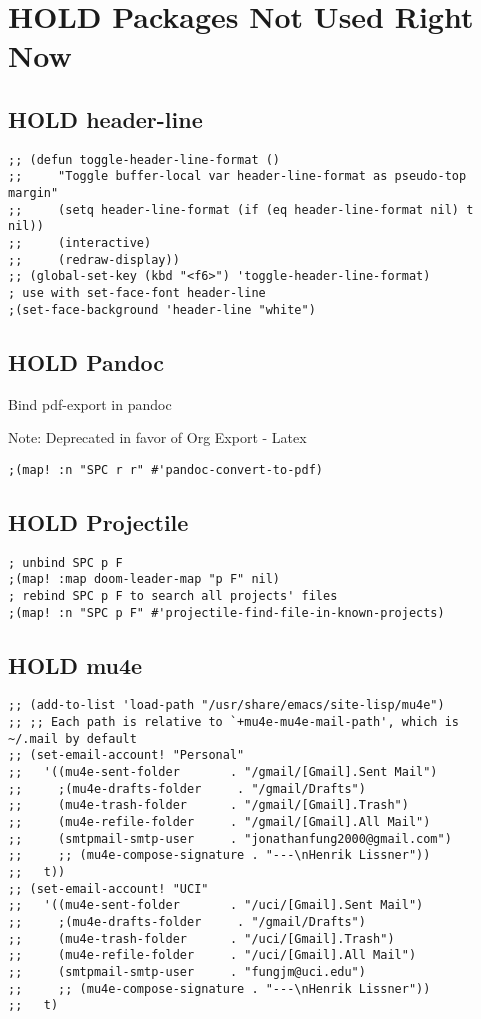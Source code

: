\documentclass[8pt]{article}
\begin{document}
\section{{\bfseries\sffamily HOLD} Packages Not Used Right Now}
\label{sec:org2ac471a}
\subsection{{\bfseries\sffamily HOLD} header-line}
\label{sec:orgdb8c6fd}
\begin{verbatim}
;; (defun toggle-header-line-format ()
;;     "Toggle buffer-local var header-line-format as pseudo-top margin"
;;     (setq header-line-format (if (eq header-line-format nil) t nil))
;;     (interactive)
;;     (redraw-display))
;; (global-set-key (kbd "<f6>") 'toggle-header-line-format)
; use with set-face-font header-line
;(set-face-background 'header-line "white")
\end{verbatim}

\subsection{{\bfseries\sffamily HOLD} Pandoc}
\label{sec:orgf82f4c5}
Bind pdf-export in pandoc

Note: Deprecated in favor of Org Export - Latex
\begin{verbatim}
;(map! :n "SPC r r" #'pandoc-convert-to-pdf)
\end{verbatim}
\subsection{{\bfseries\sffamily HOLD} Projectile}
\label{sec:org6f0b4da}
\begin{verbatim}
; unbind SPC p F
;(map! :map doom-leader-map "p F" nil)
; rebind SPC p F to search all projects' files
;(map! :n "SPC p F" #'projectile-find-file-in-known-projects)
\end{verbatim}

\subsection{{\bfseries\sffamily HOLD} mu4e}
\label{sec:org46aa5e1}
\begin{verbatim}
;; (add-to-list 'load-path "/usr/share/emacs/site-lisp/mu4e")
;; ;; Each path is relative to `+mu4e-mu4e-mail-path', which is ~/.mail by default
;; (set-email-account! "Personal"
;;   '((mu4e-sent-folder       . "/gmail/[Gmail].Sent Mail")
;;     ;(mu4e-drafts-folder     . "/gmail/Drafts")
;;     (mu4e-trash-folder      . "/gmail/[Gmail].Trash")
;;     (mu4e-refile-folder     . "/gmail/[Gmail].All Mail")
;;     (smtpmail-smtp-user     . "jonathanfung2000@gmail.com")
;;     ;; (mu4e-compose-signature . "---\nHenrik Lissner"))
;;   t))
;; (set-email-account! "UCI"
;;   '((mu4e-sent-folder       . "/uci/[Gmail].Sent Mail")
;;     ;(mu4e-drafts-folder     . "/gmail/Drafts")
;;     (mu4e-trash-folder      . "/uci/[Gmail].Trash")
;;     (mu4e-refile-folder     . "/uci/[Gmail].All Mail")
;;     (smtpmail-smtp-user     . "fungjm@uci.edu")
;;     ;; (mu4e-compose-signature . "---\nHenrik Lissner"))
;;   t)
\end{verbatim}
\end{document}
